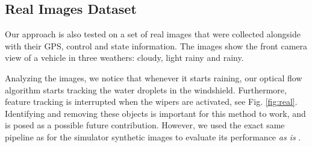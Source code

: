 \documentclass[letterpaper, 10 pt, conference]{ieeeconf}  %
\begin{document}
\begin{table}[h!]
\centering
\caption{Simulator results comparison table, prediction accuracy ($\%$) for throttle $a$ and steering $\delta$ with respect to PID, mean square error for desired trajectory.}
\label{tab:simres}
\end{table}


\subsection{Real Images Dataset}

Our approach is also tested on a set of real images that were collected alongside with their GPS, control and state information. The images show the front camera view of a vehicle in three weathers: cloudy, light rainy and rainy.

Analyzing the images, we notice that whenever it starts raining, our optical flow algorithm starts tracking the water droplets in the windshield. Furthermore, feature tracking is interrupted when the wipers are activated, see Fig. \ref{fig:real}. Identifying and removing these objects is important for this method to work, and is posed as a possible future contribution. However, we used the exact same pipeline as for the simulator synthetic images to evaluate its performance \textit{as is} .
\end{document}
